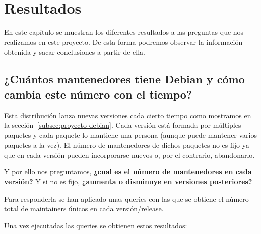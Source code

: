 \documentclass[a4paper, 12pt]{book}
\begin{document}

\cleardoublepage
\chapter{Resultados}
\label{chap:resultados}

En este capítulo se muestran los diferentes resultados a las preguntas que nos realizamos en este proyecto. De esta forma podremos observar la información obtenida y sacar conclusiones a partir de ella.

\section{¿Cuántos mantenedores tiene Debian y cómo cambia este número con el tiempo?}
\label{sec:pregunta_1}
Esta distribución lanza nuevas versiones cada cierto tiempo como mostramos en la sección~\ref{subsec:proyecto debian}. Cada versión está formada por múltiples paquetes y cada paquete lo mantiene una persona (aunque puede mantener varios paquetes a la vez). El número de mantenedores de dichos paquetes no es fijo ya que en cada versión pueden incorporarse nuevos o, por el contrario, abandonarlo.

Y por ello nos preguntamos,  \textbf{¿cual es el número de mantenedores en cada versión?} Y si no es fijo, \textbf{¿aumenta o disminuye en versiones posteriores?}

Para responderla se han aplicado unas queries con las que se obtiene el número total de maintainers únicos en cada versión/release.

Una vez ejecutadas las queries se obtienen estos resultados:
\end{document}
